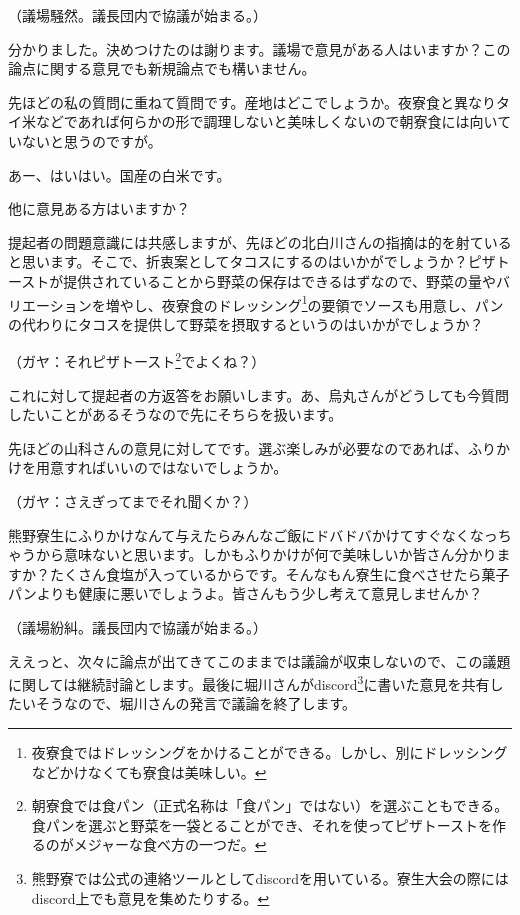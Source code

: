 \begin{description}
\begin{description}
\par
\centerline{（議場騒然。議長団内で協議が始まる。）}
\item[議長：]分かりました。決めつけたのは謝ります。議場で意見がある人はいますか？この論点に関する意見でも新規論点でも構いません。
\item[祇園：]先ほどの私の質問に重ねて質問です。産地はどこでしょうか。夜寮食と異なりタイ米などであれば何らかの形で調理しないと美味しくないので朝寮食には向いていないと思うのですが。
\item[熊野：]あー、はいはい。国産の白米です。
\item[議長：]他に意見ある方はいますか？
\item[今出川：]提起者の問題意識には共感しますが、先ほどの北白川さんの指摘は的を射ていると思います。そこで、折衷案としてタコスにするのはいかがでしょうか？ピザトーストが提供されていることから野菜の保存はできるはずなので、野菜の量やバリエーションを増やし、夜寮食のドレッシング\footnote{夜寮食ではドレッシングをかけることができる。しかし、別にドレッシングなどかけなくても寮食は美味しい。}の要領でソースも用意し、パンの代わりにタコスを提供して野菜を摂取するというのはいかがでしょうか？
\par
\centerline{（ガヤ：それピザトースト\footnote{朝寮食では食パン（正式名称は「食パン」ではない）を選ぶこともできる。食パンを選ぶと野菜を一袋とることができ、それを使ってピザトーストを作るのがメジャーな食べ方の一つだ。}でよくね？）}
\item[議長：]これに対して提起者の方返答をお願いします。あ、烏丸さんがどうしても今質問したいことがあるそうなので先にそちらを扱います。
\item[烏丸：]先ほどの山科さんの意見に対してです。選ぶ楽しみが必要なのであれば、ふりかけを用意すればいいのではないでしょうか。
\par
\centerline{（ガヤ：さえぎってまでそれ聞くか？）}
\item[伏見：]熊野寮生にふりかけなんて与えたらみんなご飯にドバドバかけてすぐなくなっちゃうから意味ないと思います。しかもふりかけが何で美味しいか皆さん分かりますか？たくさん食塩が入っているからです。そんなもん寮生に食べさせたら菓子パンよりも健康に悪いでしょうよ。皆さんもう少し考えて意見しませんか？
\par
\centerline{（議場紛糾。議長団内で協議が始まる。）}
\item[議長：]ええっと、次々に論点が出てきてこのままでは議論が収束しないので、この議題に関しては継続討論とします。最後に堀川さんがdiscord\footnote{熊野寮では公式の連絡ツールとしてdiscordを用いている。寮生大会の際にはdiscord上でも意見を集めたりする。}に書いた意見を共有したいそうなので、堀川さんの発言で議論を終了します。

\end{description}
\end{description}
